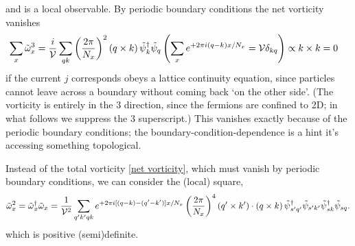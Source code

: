 and is a local observable.
By periodic boundary conditions the net vorticity vanishes
\begin{align}
	\sum_x \tilde{\omega}^3_x 
	&=
	\frac{i}{\mathcal{V}}
	\sum_{qk} \left(\frac{2\pi}{N_x}\right)^2
	(q \times k)\,
	\tilde{\psi}{}^{\dagger}_{k} \tilde{\psi}_{q}
	\left(\sum_x e^{+2\pi i (q-k) x / N_x} = \mathcal{V} \delta_{kq}\right)
	\propto
	k \times k
	=
	0
	\label{eq:net vorticity}
\end{align}
if the current $j$ corresponds obeys a lattice continuity equation, since particles cannot leave across a boundary without coming back `on the other side'.
(The vorticity is entirely in the 3 direction, since the fermions are confined to 2D; in what follows we suppress the 3 superscript.)
This vanishes exactly because of the periodic boundary conditions; the boundary-condition-dependence is a hint it's accessing something topological.

Instead of the total vorticity \eqref{net vorticity}, which must vanish by periodic boundary conditions, we can consider the (local) square,
\begin{align}
	\tilde{\omega}^2_x = \tilde{\omega}{}^{\dagger}_x \tilde{\omega}_x
	=
	\frac{1}{\mathcal{V}^2} \sum_{q'k'qk} e^{+2\pi i[ (q-k) - (q'-k') ] x / N_x}
	\left(\frac{2\pi}{N_x}\right)^4 (q' \times k') \cdot (q \times k)\,
	\tilde{\psi}{}^{\dagger}_{s'q'} \tilde{\psi}_{s'k'} \tilde{\psi}{}^{\dagger}_{sk} \tilde{\psi}_{sq}.
\end{align}
which is positive (semi)definite.

